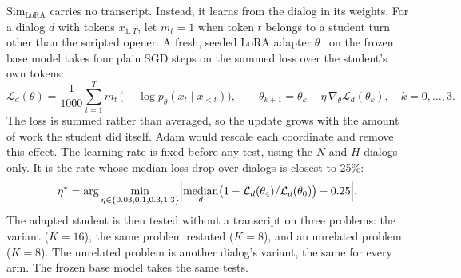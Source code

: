 \documentclass{article} %
\newcommand{\simL}{\ensuremath{\text{Sim}_{\text{LoRA}}}}
\begin{document}
\simL{} carries no transcript. Instead, it learns from the dialog in its weights. For a dialog $d$ with tokens $x_{1:T}$, let $m_t=1$ when token $t$ belongs to a student turn other than the scripted opener. A fresh, seeded LoRA adapter $\theta$~\citep{hu2022lora} on the frozen base model takes four plain SGD steps on the summed loss over the student's own tokens:
\begin{equation}
\mathcal{L}_d(\theta)=\frac{1}{1000}\sum_{t=1}^{T} m_t\,\bigl(-\log p_\theta(x_t\mid x_{<t})\bigr),\qquad
\theta_{k+1}=\theta_k-\eta\,\nabla_\theta\mathcal{L}_d(\theta_k),\quad k=0,\dots,3.
\end{equation}
The loss is summed rather than averaged, so the update grows with the amount of work the student did itself. Adam would rescale each coordinate and remove this effect. The learning rate is fixed before any test, using the $N$ and $H$ dialogs only. It is the rate whose median loss drop over dialogs is closest to 25\%:
\begin{equation}
\eta^\star=\arg\min_{\eta\in\{0.03,0.1,0.3,1,3\}}\Bigl|\operatorname*{median}_{d}\bigl(1-\mathcal{L}_d(\theta_4)/\mathcal{L}_d(\theta_0)\bigr)-0.25\Bigr|.
\end{equation}
The adapted student is then tested without a transcript on three problems: the variant ($K=16$), the same problem restated ($K=8$), and an unrelated problem ($K=8$). The unrelated problem is another dialog's variant, the same for every arm. The frozen base model takes the same tests.
\end{document}
